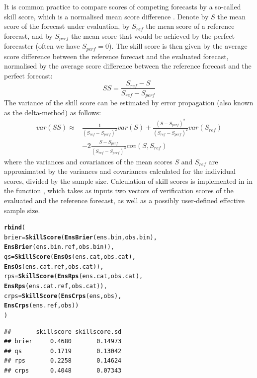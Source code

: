 \documentclass[article]{jss}\usepackage{graphicx, color}
\makeatletter
\newcommand{\hlfunctioncall}[1]{\textcolor[rgb]{0,0.501960784313725,0.752941176470588}{\textbf{#1}}}%
\newenvironment{kframe}{%
 \def\at@end@of@kframe{}%
 \ifinner\ifhmode%
  \def\at@end@of@kframe{\end{minipage}}%
  \begin{minipage}{\columnwidth}%
 \fi\fi%
 \def\FrameCommand##1{\hskip\@totalleftmargin \hskip-\fboxsep
 \colorbox{shadecolor}{##1}\hskip-\fboxsep
     \hskip-\linewidth \hskip-\@totalleftmargin \hskip\columnwidth}%
 \MakeFramed {\advance\hsize-\width
   \@totalleftmargin\z@ \linewidth\hsize
   \@setminipage}}%
 {\par\unskip\endMakeFramed%
 \at@end@of@kframe}
\newenvironment{knitrout}{}{} %
\makeatother
\begin{document}
It is common practice to compare scores of competing forecasts by a so-called skill score, which is a normalised mean score difference \citep{wilks2011statistical}.
Denote by $S$ the mean score of the forecast under evaluation, by $S_{ref}$ the mean score of a reference forecast, and by $S_{perf}$ the mean score that would be achieved by the perfect forecaster (often we have $S_{perf}=0$).
The skill score is then given by the average score difference between the reference forecast and the evaluated forecast, normalised by the average score difference between the reference forecast and the perfect forecast:
%
\begin{equation}
SS = \frac{S_{ref} - S}{S_{ref} - S_{perf}}
\end{equation}
%
The variance of the skill score can be estimated by error propagation (also known as the delta-method) as follows:
%
\begin{align}
var(SS) \approx & \frac{1}{(S_{ref} - S_{perf})^2} var(S) + \frac{(S - S_{perf})^2}{(S_{ref}-S_{perf})^2} var(S_{ref})\nonumber\\
& - 2 \frac{S-S_{perf}}{(S_{ref}-S_{perf})^3} cov(S, S_{ref})
\end{align}
%
where the variances and covariances of the mean scores $S$ and $S_{ref}$ are approximated by the variances and covariances calculated for the individual scores, divided by the sample size.
Calculation of skill scores is implemented in  in the function , which takes as inputs two vectors of verification scores of the evaluated and the reference forecast, as well as a possibly user-defined effective sample size.


\begin{knitrout}
\color{fgcolor}\begin{kframe}
\begin{alltt}
\hlfunctioncall{rbind}(
  brier = \hlfunctioncall{SkillScore}(\hlfunctioncall{EnsBrier}(ens.bin, obs.bin), 
                     \hlfunctioncall{EnsBrier}(ens.bin.ref, obs.bin)),
  qs    = \hlfunctioncall{SkillScore}(\hlfunctioncall{EnsQs}(ens.cat, obs.cat),    
                     \hlfunctioncall{EnsQs}(ens.cat.ref, obs.cat)),
  rps   = \hlfunctioncall{SkillScore}(\hlfunctioncall{EnsRps}(ens.cat, obs.cat),   
                     \hlfunctioncall{EnsRps}(ens.cat.ref, obs.cat)),
  crps  = \hlfunctioncall{SkillScore}(\hlfunctioncall{EnsCrps}(ens, obs),          
                     \hlfunctioncall{EnsCrps}(ens.ref, obs))
)
\end{alltt}
\begin{verbatim}
##       skillscore skillscore.sd
## brier     0.4680       0.14973
## qs        0.1719       0.13042
## rps       0.2258       0.14624
## crps      0.4048       0.07343
\end{verbatim}
\end{kframe}
\end{knitrout}
\end{document}
